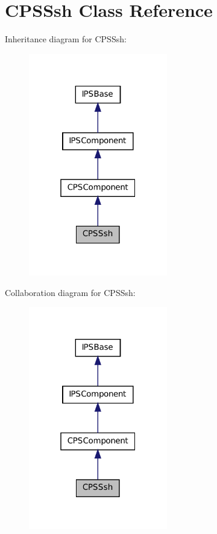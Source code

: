 \hypertarget{classCPSSsh}{
\section{CPSSsh Class Reference}
\label{classCPSSsh}
}


Inheritance diagram for CPSSsh:\nopagebreak
\begin{figure}[H]
\begin{center}
\leavevmode
\includegraphics[width=172pt]{classCPSSsh__inherit__graph}
\end{center}
\end{figure}


Collaboration diagram for CPSSsh:\nopagebreak
\begin{figure}[H]
\begin{center}
\leavevmode
\includegraphics[width=172pt]{classCPSSsh__coll__graph}
\end{center}
\end{figure}
